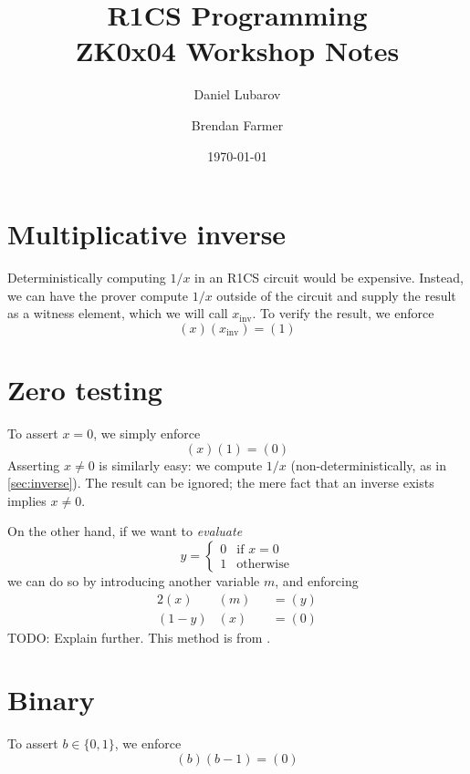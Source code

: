 \documentclass{article}
\title{R1CS Programming \\ \large ZK0x04 Workshop Notes}
\author{Daniel Lubarov \and Brendan Farmer}
\date{\today}
\begin{document}
\maketitle

{\hypersetup{hidelinks} \tableofcontents}
\newpage


\section{Multiplicative inverse} \label{sec:inverse}

Deterministically computing $1 / x$ in an R1CS circuit would be expensive. Instead, we can have the prover compute $1 / x$ outside of the circuit and supply the result as a witness element, which we will call $x_\mathrm{inv}$. To verify the result, we enforce
\begin{equation}
  (x) (x_\mathrm{inv}) = (1)
\end{equation}


\section{Zero testing}

To assert $x = 0$, we simply enforce
\begin{equation}
  (x) (1) = (0)
\end{equation}
Asserting $x \ne 0$ is similarly easy: we compute $1 / x$ (non-deterministically, as in \autoref{sec:inverse}). The result can be ignored; the mere fact that an inverse exists implies $x \ne 0$.

On the other hand, if we want to \textit{evaluate}
\begin{equation}
  y =
  \begin{cases}
    0 & \text{if $x = 0$} \\
    1 & \text{otherwise}
  \end{cases}
\end{equation}
we can do so by introducing another variable $m$, and enforcing
\begin{alignat}{2}
  (x)     & (m) &&= (y) \\
  (1 - y) & (x) &&= (0)
\end{alignat}
TODO: Explain further.
This method is from \cite{parno2013pinocchio}.


\section{Binary}

To assert $b \in \{ 0, 1 \}$, we enforce
\begin{equation}
  (b) (b - 1) = (0)
\end{equation}
\end{document}
